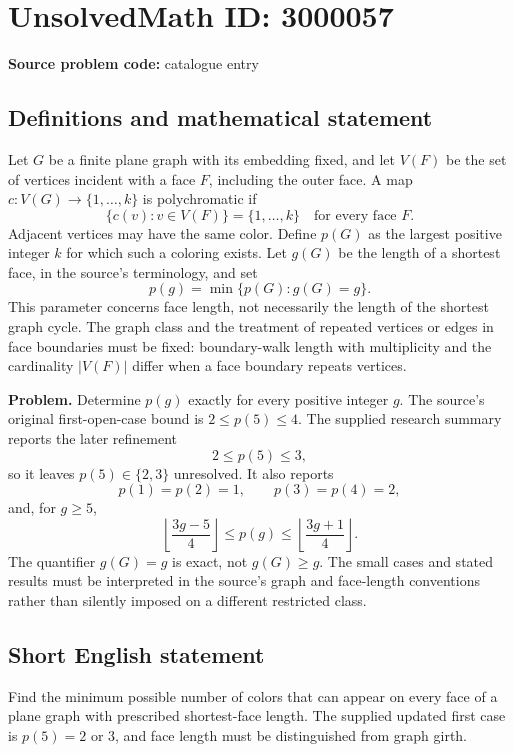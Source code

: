 \documentclass[11pt]{article}
\begin{document}
\section*{UnsolvedMath ID: 3000057}
\textbf{Source problem code:} catalogue entry
\subsection{Definitions and mathematical statement}
Let $G$ be a finite plane graph with its embedding fixed, and let $V(F)$ be the set of vertices incident with a face $F$, including the outer face. A map $c:V(G)\to\{1,\ldots,k\}$ is polychromatic if
\[
\{c(v):v\in V(F)\}=\{1,\ldots,k\}\quad\text{for every face }F.
\]
Adjacent vertices may have the same color. Define $p(G)$ as the largest positive integer $k$ for which such a coloring exists. Let $g(G)$ be the length of a shortest face, in the source's terminology, and set
\[
p(g)=\min\{p(G):g(G)=g\}.
\]
This parameter concerns face length, not necessarily the length of the shortest graph cycle. The graph class and the treatment of repeated vertices or edges in face boundaries must be fixed: boundary-walk length with multiplicity and the cardinality $|V(F)|$ differ when a face boundary repeats vertices.

\textbf{Problem.} Determine $p(g)$ exactly for every positive integer $g$. The source's original first-open-case bound is $2\leq p(5)\leq4$. The supplied research summary reports the later refinement
\[
2\leq p(5)\leq3,
\]
so it leaves $p(5)\in\{2,3\}$ unresolved. It also reports
\[
p(1)=p(2)=1,\qquad p(3)=p(4)=2,
\]
and, for $g\geq5$,
\[
\left\lfloor\frac{3g-5}{4}\right\rfloor
\leq p(g)\leq
\left\lfloor\frac{3g+1}{4}\right\rfloor.
\]
The quantifier $g(G)=g$ is exact, not $g(G)\geq g$. The small cases and stated results must be interpreted in the source's graph and face-length conventions rather than silently imposed on a different restricted class.
\subsection{Short English statement}
Find the minimum possible number of colors that can appear on every face of a plane graph with prescribed shortest-face length. The supplied updated first case is $p(5)=2$ or $3$, and face length must be distinguished from graph girth.
\end{document}
